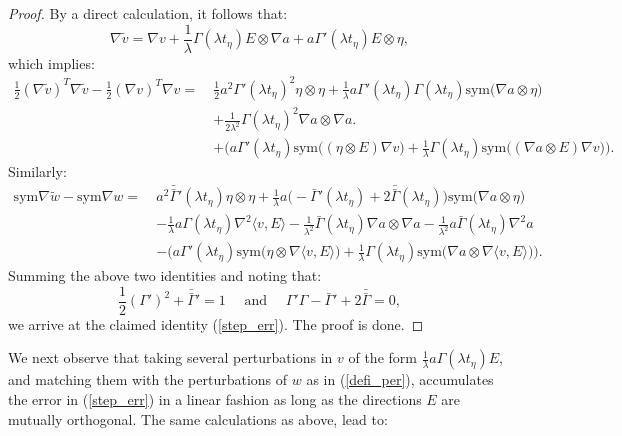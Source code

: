 \documentclass[reqno,twoside,11pt]{amsart}
\newcommand{\sym}{\mathrm{sym}}
\newcommand*{\dbar}[1]{\bar{\bar{#1}}}
\numberwithin{equation}{section}
\theoremstyle{plain}
\theoremstyle{definition}
\begin{document}
\begin{proof}
By a direct calculation, it follows that:
$$\nabla \tilde v=\nabla v +\frac{1}{\lambda} \Gamma(\lambda
t_\eta)E\otimes \nabla a + a\Gamma'(\lambda t_\eta)E\otimes \eta,$$
which implies:
\begin{equation*}
\begin{split}
\frac{1}{2}(\nabla \tilde v)^T \nabla \tilde v - \frac{1}{2}(\nabla v)^T \nabla v
= ~ & \frac{1}{2} a^2 \Gamma'(\lambda t_\eta)^2\eta\otimes\eta +
\frac{1}{\lambda} a \Gamma'(\lambda t_\eta)\Gamma(\lambda t_\eta)
\sym\big(\nabla a\otimes\eta \big)
\\ &  + \frac{1}{2\lambda^2} \Gamma(\lambda t_\eta)^2\nabla
a\otimes\nabla a.
\\ & + \Big(a\Gamma'(\lambda t_\eta)\sym \big((\eta\otimes E)\nabla v\big)
+ \frac{1}{\lambda} \Gamma(\lambda t_\eta)\sym \big((\nabla a\otimes E)\nabla v\big)\Big).
\end{split}
\end{equation*}
Similarly:
\begin{equation*}
\begin{split}
\sym\nabla \tilde w - \sym\nabla w
= ~ & a^2 \dbar\Gamma'(\lambda t_\eta)\eta\otimes\eta
+\frac{1}{\lambda} a \big(-\bar\Gamma' (\lambda t_\eta)+2\dbar 
\Gamma (\lambda t_\eta)\big) \sym\big(\nabla a\otimes \eta\big)
\\ & - \frac{1}{\lambda} a \Gamma(\lambda t_\eta)\nabla^2\langle v,E\rangle
- \frac{1}{\lambda^2} \bar\Gamma(\lambda t_\eta)\nabla
a\otimes\nabla a - \frac{1}{\lambda^2}a \bar\Gamma(\lambda t_\eta)\nabla^2a
\\ & - \Big(a\Gamma'(\lambda t_\eta)\sym \big(\eta\otimes \nabla \langle v, E\rangle\big)
+ \frac{1}{\lambda} \Gamma(\lambda t_\eta)\sym \big(\nabla a\otimes \nabla \langle v, E\rangle\big)\Big).
\end{split}
\end{equation*}
Summing the above two identities and noting that:
\begin{equation}\label{trip_c}
\frac{1}{2}(\Gamma')^2 + \dbar\Gamma' =1 \quad \mbox{ and }\quad
\Gamma'\Gamma - \bar\Gamma' + 2\dbar\Gamma = 0,
\end{equation}
we arrive at the claimed identity (\ref{step_err}). The proof is done.
\end{proof}

\smallskip

\noindent We next observe that taking several perturbations in $v$ of the form
$\frac{1}{\lambda}a\Gamma(\lambda t_\eta) E$, and matching them with the
perturbations of $w$ as in (\ref{defi_per}), accumulates the error in
(\ref{step_err}) in a linear fashion as long as the directions $E$
are mutually orthogonal. The same calculations as above, lead to:
\end{document}
